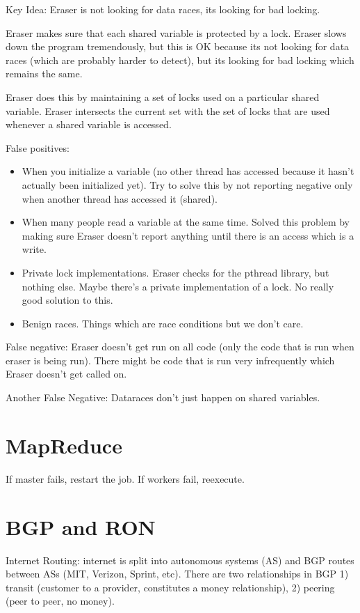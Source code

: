 \documentclass[psamsfonts]{amsart}
\begin{document}
Key Idea: Eraser is not looking for data races, its looking for bad locking.

Eraser makes sure that each shared variable is protected by a lock. Eraser slows down the program tremendously, but this is OK because its not looking for data races (which are probably harder to detect), but its looking for bad locking which remains the same.

Eraser does this by maintaining a set of locks used on a particular shared variable. Eraser intersects the current set with the set of locks that are used whenever a shared variable is accessed.

False positives: 
\begin{itemize}
  \item When you initialize a variable (no other thread has accessed because it hasn't actually been initialized yet). Try to solve this by not reporting negative only when another thread has accessed it (shared).
  \item When many people read a variable at the same time. Solved this problem by making sure Eraser doesn't report anything until there is an access which is a write.
  \item Private lock implementations. Eraser checks for the pthread library, but nothing else. Maybe there's a private implementation of a lock. No really good solution to this.
  \item Benign races. Things which are race conditions but we don't care.
\end{itemize}

False negative: Eraser doesn't get run on all code (only the code that is run when eraser is being run). There might be code that is run very infrequently which Eraser doesn't get called on.

Another False Negative: Dataraces don't just happen on shared variables.

\section{MapReduce}

If master fails, restart the job. If workers fail, reexecute.

\section{BGP and RON}

Internet Routing: internet is split into autonomous systems (AS) and BGP routes between ASs (MIT, Verizon, Sprint, etc). There are two relationships in BGP 1) transit (customer to a provider, constitutes a money relationship), 2) peering (peer to peer, no money).
\end{document}
